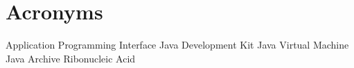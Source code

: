 \chapter{Acronyms}
\begin{acronym}
   {Application Programming Interface}
   {Java Development Kit}
   {Java Virtual Machine}
   {Java Archive}
   {Ribonucleic Acid}
\end{acronym}
